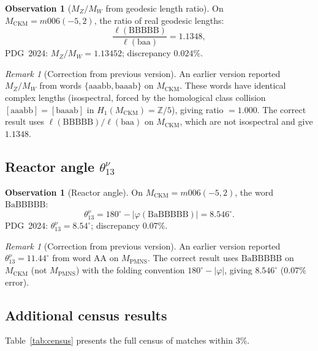 \documentclass[11pt,a4paper]{article}
\theoremstyle{definition}
\newtheorem{observation}[theorem]{Observation}
\theoremstyle{remark}
\newtheorem{remark}[theorem]{Remark}
\newcommand{\Zfive}{\mathbb{Z}/5}
\newcommand{\MPMNS}{M_{\mathrm{PMNS}}}
\newcommand{\MCKM}{M_{\mathrm{CKM}}}
\newcommand{\degr}{^{\circ}}
\begin{document}
\begin{observation}[$M_Z/M_W$ from geodesic length ratio]
\label{obs:mzmw}
On $\MCKM = m006(-5,2)$, the ratio of real geodesic lengths:
\begin{equation}
  \frac{\ell(\mathrm{BBBBB})}{\ell(\mathrm{baa})}
  = 1.1348,
  \label{eq:mzmw}
\end{equation}
PDG~2024: $M_Z/M_W = 1.13452$; discrepancy $0.024\%$.
\end{observation}

\begin{remark}[Correction from previous version]
An earlier version reported $M_Z/M_W$ from words $\{\mathrm{aaabb},\mathrm{baaab}\}$
on $\MCKM$.
These words have identical complex lengths (isospectral, forced by the
homological class collision $[\mathrm{aaabb}]=[\mathrm{baaab}]$ in
$H_1(\MCKM)=\Zfive$), giving ratio $= 1.000$.
The correct result uses $\ell(\mathrm{BBBBB})/\ell(\mathrm{baa})$
on $\MCKM$, which are not isospectral and give $1.1348$.
\end{remark}

\subsection{Reactor angle $\theta_{13}^\nu$}
\label{sec:theta13}

\begin{observation}[Reactor angle]
\label{obs:theta13}
On $\MCKM = m006(-5,2)$, the word $\mathrm{BaBBBBB}$:
\begin{equation}
  \theta_{13}^\nu = 180\degr - |\varphi(\mathrm{BaBBBBB})| = 8.546\degr.
  \label{eq:theta13}
\end{equation}
PDG~2024: $\theta_{13}^\nu = 8.54\degr$; discrepancy $0.07\%$.
\end{observation}

\begin{remark}[Correction from previous version]
An earlier version reported $\theta_{13}^\nu = 11.44\degr$ from word
$\mathrm{AA}$ on $\MPMNS$.
The correct result uses $\mathrm{BaBBBBB}$ on $\MCKM$ (not $\MPMNS$)
with the folding convention $180\degr - |\varphi|$,
giving $8.546\degr$ ($0.07\%$ error).
\end{remark}

\subsection{Additional census results}
\label{sec:census}

Table~\ref{tab:census} presents the full census of matches within $3\%$.
\end{document}
